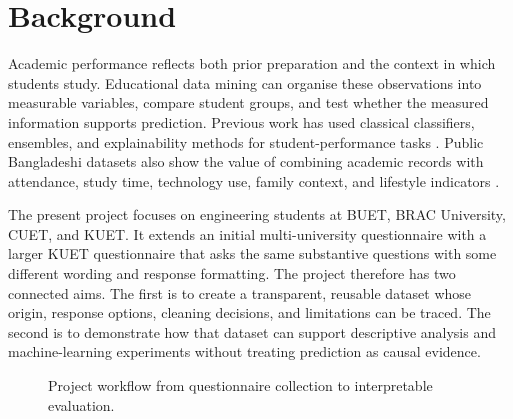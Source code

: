 \section{Background}
Academic performance reflects both prior preparation and the context in which students study. Educational data mining can organise these observations into measurable variables, compare student groups, and test whether the measured information supports prediction. Previous work has used classical classifiers, ensembles, and explainability methods for student-performance tasks \cite{ahmed2024,maruf2024,albonny2026}. Public Bangladeshi datasets also show the value of combining academic records with attendance, study time, technology use, family context, and lifestyle indicators \cite{prama2024,rahman2024,rahman2025,maruf2025}.

The present project focuses on engineering students at BUET, BRAC University, CUET, and KUET. It extends an initial multi-university questionnaire with a larger KUET questionnaire that asks the same substantive questions with some different wording and response formatting. The project therefore has two connected aims. The first is to create a transparent, reusable dataset whose origin, response options, cleaning decisions, and limitations can be traced. The second is to demonstrate how that dataset can support descriptive analysis and machine-learning experiments without treating prediction as causal evidence.

\begin{figure}[H]
\centering
{}
\caption{Project workflow from questionnaire collection to interpretable evaluation.}
\label{fig:project-flow}
\end{figure}

